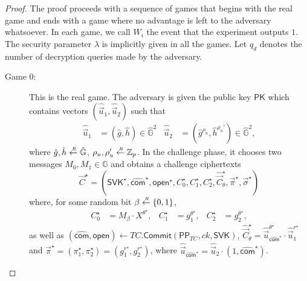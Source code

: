 \documentclass[10pt]{llncs}
\newcommand{\G}{\mathbb{G}}
\newcommand{\Z}{\mathbb{Z}}
\newcommand{\PK}{\mathsf{PK}}
\newcommand{\SVK}{\mathsf{SVK}}
\newcommand{\com}{\hat{\mathsf{com}}}
\newcommand{\open}{\mathsf{open}}
\newcommand{\sample}{\stackrel{{\scriptscriptstyle \mkern4mu R}}{\gets}}
\newcommand{\Com}{{\mathsf{Commit}}}
\newcommand{\PPP}{\mathsf{PP}}
\begin{document}
\begin{proof}
  The proof proceeds with a sequence of games that begins with the real game 
  and ends with a game where no advantage is left to the adversary whatsoever. 
  In each game, we call $W_i$ the event that the experiment outputs $1$. 
  The security parameter $\lambda$ is implicitly given in all the games.
  Let $q_d$ denotes the number of decryption queries made by the adversary.

  \begin{description}
  \item[\textsf{Game} $0$:] This is the real game. The adversary is given the public key $\PK$ which contains 
    vectors 
    $(\hat{\vec{u}}_1, \hat{\vec{u}}_2)$ such that
    \begin{align} \label{vec-PK} 
      \hat{\vec{u}}_1 &= (\hat{g}, \hat{h}) \in \hat{\G}^2  &
      \hat{\vec{u}}_2 &=  (\hat{g}^{\rho_u}, \hat{h}^{\rho_u'}) \in \hat{\G}^2,
    \end{align}
    where $\hat{g},\hat{h} \sample \hat{\G}$,  $\rho_u,\rho_u' \sample \Z_p$.
    In the challenge phase, 
    it chooses two messages $M_0,M_1 \in \G$ and obtains a challenge ciphertexts 
    $$  \vec{C}^\star = (\SVK^\star, \com^\star, \open^\star, C_0^\star, C_1^\star, C_2^\star, \hat{\vec{C}}_{\theta}^\star, \vec{\pi}^\star, \vec{\sigma}^\star)  $$
    where, for some random bit $\beta \sample \{0,1\}$,
    \begin{align*}
      C_0^\star &= M_{\beta} \cdot X^{\theta^\star}, & C_1^\star &= g_1^{\theta^\star}, & C_2^\star &= g_2^{\theta^\star},
    \end{align*}
     as well as $(\com, \open) \gets TC.\Com(\PPP_{TC}, {ck}, \SVK)$,
     $\hat{\vec{C}}_{\theta}^\star=\hat{\vec{u}}_{\com^\star}^{\theta^\star}
     \cdot \hat{\vec{u}}_1^{r^\star}$
     and $\vec{\pi}^\star=(\pi_1^\star,\pi_2^\star) =(g_1^{r^\star},g_2^{r^\star})$,
     where 
    $\hat{\vec{u}}_{\com^\star} = \hat{\vec{u}}_2\cdot (1, \com^\star)$.
   

\end{description}
\end{proof}
\end{document}
